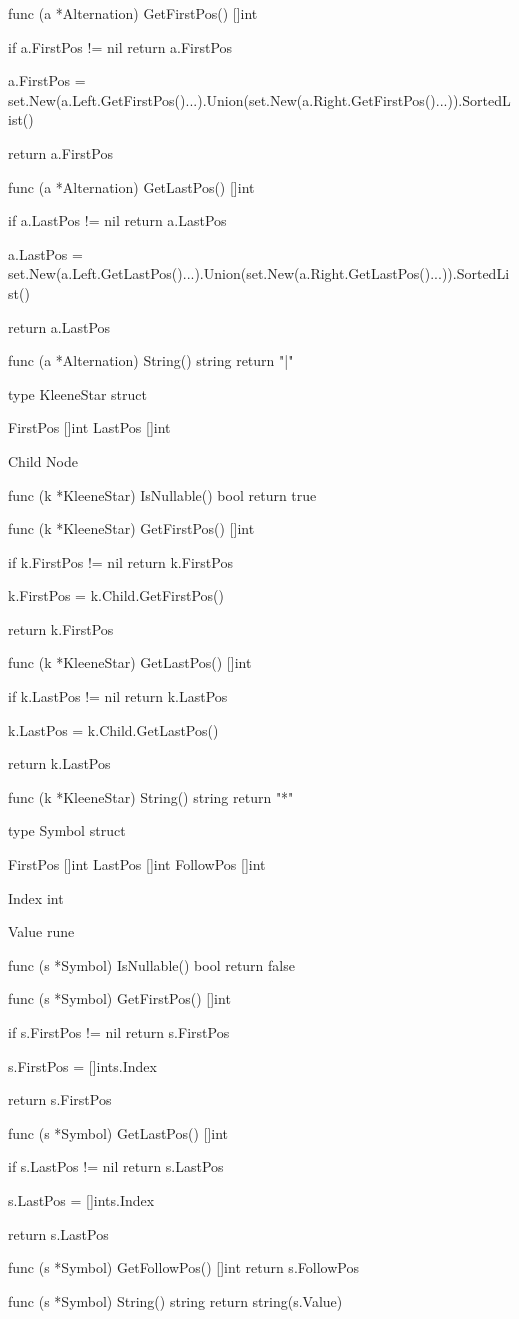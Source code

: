 func (a *Alternation) GetFirstPos() []int {
	if a.FirstPos != nil {
		return a.FirstPos
	}

	a.FirstPos = set.New(a.Left.GetFirstPos()...).Union(set.New(a.Right.GetFirstPos()...)).SortedList()

	return a.FirstPos
}

func (a *Alternation) GetLastPos() []int {
	if a.LastPos != nil {
		return a.LastPos
	}

	a.LastPos = set.New(a.Left.GetLastPos()...).Union(set.New(a.Right.GetLastPos()...)).SortedList()

	return a.LastPos
}

func (a *Alternation) String() string {
	return "|"
}

type KleeneStar struct {
	FirstPos []int
	LastPos  []int

	Child Node
}

func (k *KleeneStar) IsNullable() bool { return true }

func (k *KleeneStar) GetFirstPos() []int {
	if k.FirstPos != nil {
		return k.FirstPos
	}

	k.FirstPos = k.Child.GetFirstPos()

	return k.FirstPos
}

func (k *KleeneStar) GetLastPos() []int {
	if k.LastPos != nil {
		return k.LastPos
	}

	k.LastPos = k.Child.GetLastPos()

	return k.LastPos
}

func (k *KleeneStar) String() string {
	return "*"
}

type Symbol struct {
	FirstPos  []int
	LastPos   []int
	FollowPos []int

	Index int

	Value rune
}

func (s *Symbol) IsNullable() bool { return false }

func (s *Symbol) GetFirstPos() []int {
	if s.FirstPos != nil {
		return s.FirstPos
	}

	s.FirstPos = []int{s.Index}

	return s.FirstPos
}

func (s *Symbol) GetLastPos() []int {
	if s.LastPos != nil {
		return s.LastPos
	}

	s.LastPos = []int{s.Index}

	return s.LastPos
}

func (s *Symbol) GetFollowPos() []int {
	return s.FollowPos
}

func (s *Symbol) String() string {
	return string(s.Value)
}
